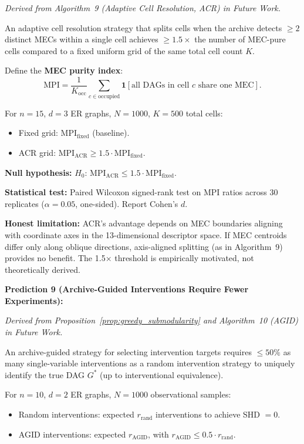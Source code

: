 \documentclass{article}
\theoremstyle{definition}
\theoremstyle{plain}
\theoremstyle{remark}
\begin{document}
\emph{Derived from Algorithm~9 (Adaptive Cell Resolution, ACR) in Future Work.}

An adaptive cell resolution strategy that splits cells when the archive detects
$\geq 2$ distinct MECs within a single cell achieves $\geq 1.5\times$ the number
of MEC-pure cells compared to a fixed uniform grid of the same total cell count $K$.

Define the \textbf{MEC purity index}:
\begin{equation}
\mathrm{MPI} = \frac{1}{K_{\mathrm{occ}}} \sum_{c \in \text{occupied}} \mathbf{1}[\text{all DAGs in cell } c \text{ share one MEC}].
\end{equation}

For $n = 15$, $d = 3$ ER graphs, $N = 1000$, $K = 500$ total cells:
\begin{itemize}
  \item Fixed grid: $\mathrm{MPI}_{\mathrm{fixed}}$ (baseline).
  \item ACR grid: $\mathrm{MPI}_{\mathrm{ACR}} \geq 1.5 \cdot \mathrm{MPI}_{\mathrm{fixed}}$.
\end{itemize}

\textbf{Null hypothesis:} $H_0$: $\mathrm{MPI}_{\mathrm{ACR}} \leq 1.5 \cdot \mathrm{MPI}_{\mathrm{fixed}}$.

\textbf{Statistical test:} Paired Wilcoxon signed-rank test on MPI ratios across
30 replicates ($\alpha = 0.05$, one-sided). Report Cohen's $d$.

\textbf{Honest limitation:} ACR's advantage depends on MEC boundaries aligning with
coordinate axes in the 13-dimensional descriptor space. If MEC centroids differ
only along oblique directions, axis-aligned splitting (as in Algorithm~9) provides
no benefit. The 1.5× threshold is empirically motivated, not theoretically derived.

\textbf{Prediction 9 (Archive-Guided Interventions Require Fewer Experiments):}
\label{pred:agid}

\emph{Derived from Proposition~\ref{prop:greedy_submodularity} and Algorithm~10 (AGID) in Future Work.}

An archive-guided strategy for selecting intervention targets requires $\leq 50\%$
as many single-variable interventions as a random intervention strategy to uniquely
identify the true DAG $G^*$ (up to interventional equivalence).

For $n = 10$, $d = 2$ ER graphs, $N = 1000$ observational samples:
\begin{itemize}
  \item Random interventions: expected $r_{\mathrm{rand}}$ interventions to achieve SHD $= 0$.
  \item AGID interventions: expected $r_{\mathrm{AGID}}$, with $r_{\mathrm{AGID}} \leq 0.5 \cdot r_{\mathrm{rand}}$.
\end{itemize}
\end{document}
